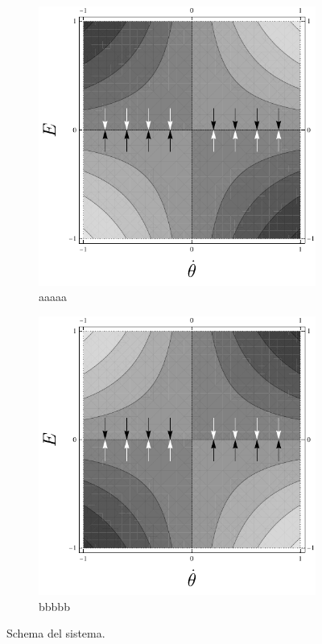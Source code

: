 \begin{figure}
    \centering
    \begin{subfigure}[b]{0.48\textwidth}
        \centering
        \includegraphics[width=\textwidth]{assets/energy-control3}
        \caption{aaaaa}
    \end{subfigure}
    \hfill
    \begin{subfigure}[b]{0.48\textwidth}
        \centering
        \includegraphics[width=\textwidth]{assets/energy-control4}
        \caption{bbbbb}
    \end{subfigure}
    \caption{Schema del sistema.} %
    \label{fig:energy-control-smooth}
\end{figure}

